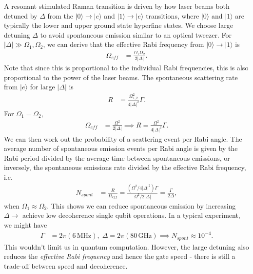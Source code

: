 \documentclass[lasers.tex]{subfiles}
\begin{document}
A resonant stimulated Raman transition is driven by how laser beams both detuned by $\Delta$ from the $|0\rangle\to|e\rangle$ and $|1\rangle\to|e\rangle$ transitions, where $|0\rangle$ and $|1\rangle$ are typically the lower and upper ground state hyperfine states.
We choose large detuning $\Delta$ to avoid spontaneous emission similar to an optical tweezer.
For $|\Delta|\gg\Omega_1,\Omega_2$, we can derive that the effective Rabi frequency from $|0\rangle\to|1\rangle$ is
\begin{align}
    \Omega_{eff} &= \frac{\Omega_1\Omega_2}{2|\Delta|}.
\end{align}
Note that since this is proportional to the individual Rabi frequencies, this is also proportional to the power of the laser beams. 
The spontaneous scattering rate from $|e\rangle$ for large $|\Delta|$ is
\begin{align}
    R &= \frac{\Omega_{1,2}^2}{4|\Delta|^2}\Gamma.
\end{align}
For $\Omega_1=\Omega_2$,
\begin{align}
    \Omega_{eff} &= \frac{\Omega^2}{2|\Delta|} \implies R = \frac{\Omega^2}{4|\Delta|^2}\Gamma.
\end{align}
We can then work out the probability of a scattering event per Rabi angle.
The average number of spontaneous emission events per Rabi angle is given by the Rabi period divided by the average time between spontaneous emissions, or inversely, the spontaneous emissions rate divided by the effective Rabi frequency, i.e.
\begin{align}
    N_{spont} &= \frac{R}{\Omega_{eff}} = \frac{(\Omega^2/4|\Delta|^2)\Gamma}{\Omega^2/2|\Delta|} = \frac{\Gamma}{2\Delta},
\end{align}
when $\Omega_1\approx\Omega_2$.
This shows we can reduce spontaneous emission by increasing $\Delta\to$ achieve low decoherence single qubit operations.
In a typical experiment, we might have
\begin{align}
    \Gamma &= 2\pi(6\,\text{MHz}),\; \Delta = 2\pi(80\,\text{GHz}) \implies N_{spont}\approx10^{-4}.
\end{align}
This wouldn't limit us in quantum computation. 
However, the large detuning also reduces the \emph{effective Rabi frequency} and hence the gate speed - there is still a trade-off between speed and decoherence.
\end{document}
